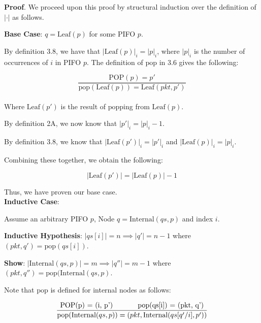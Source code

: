 \documentclass{article}
\begin{document}
\textbf{Proof}. We proceed upon this proof by structural induction over the definition of $|\cdot|$ as follows.\newline

\textbf{Base Case}: $q = \text{Leaf}(p)$ for some PIFO $p$.\newline

By definition 3.8, we have that $|\text{Leaf}(p)|_i = |p|_i$, where $|p|_i$ is the number of occurrences of $i$ in PIFO $p$. The definition of $\text{pop}$ in 3.6 gives the following:

$$\frac{\text{POP}(p) = p'}{\text{pop}(\text{Leaf}(p)) = \text{Leaf}(pkt, p')}$$\\[-10pt]

Where $\text{Leaf}(p')$ is the result of $\text{pop}$ping from $\text{Leaf}(p)$.\newline

By definition 2A, we now know that $|p'|_i = |p|_i - 1$.\newline

By definition 3.8, we know that $|\text{Leaf}(p')|_i = |p'|_i$ and $|\text{Leaf}(p)|_i = |p|_i$.\newline

Combining these together, we obtain the following:

$$|\text{Leaf}(p')| = |\text{Leaf}(p)| - 1$$

Thus, we have proven our base case.\\[10pt]

\textbf{Inductive Case}:\newline

Assume an arbitrary PIFO $p$, Node $q = \text{Internal}(qs, p)$ and index $i$.\newline

\textbf{Inductive Hypothesis}: $|qs[i]| = n \implies |q'| = n-1$ where $(pkt, q') = \text{pop}(qs[i])$.\newline

\textbf{Show}: $|\text{Internal}(qs, p)| = m \implies |q''| = m-1$ where $(pkt, q'') =\text{pop}(\text{Internal}(qs, p)$.\newline

Note that $\text{pop}$ is defined for internal nodes as follows:

$$\frac{\text{POP(p) = (i, p') \hspace{1cm} \text{pop}(qs[i]) = (pkt, q')}}{{\text{pop}(\text{Internal}(qs, p)) = (pkt, \text{Internal}(qs[q'/i], p'))}}$$\\[-10pt]
\end{document}
